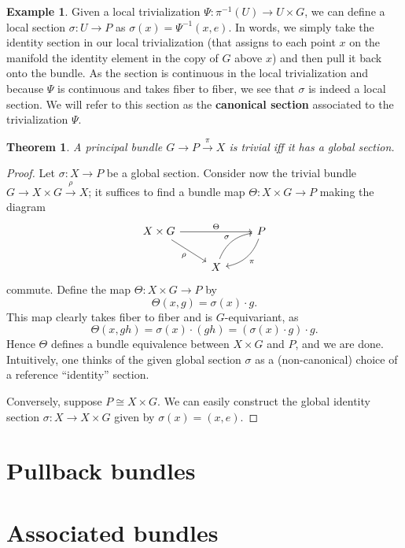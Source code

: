 \documentclass{book}
\theoremstyle{plain}
\newtheorem{thm}{Theorem}
\theoremstyle{definition}
\newtheorem{exmp}{Example}
\theoremstyle{remark}
\begin{document}
\begin{exmp}
    Given a local trivialization $\Psi:\pi^{-1}(U)\to U\times G$, we can define a local section $\sigma:U\to P$ as $\sigma(x)=\Psi^{-1}(x,e)$. In words, we simply take the identity section in our local trivialization (that assigns to each point $x$ on the manifold the identity element in the copy of $G$ above $x$) and then pull it back onto the bundle. As the section is continuous in the local trivialization and because $\Psi$ is continuous and takes fiber to fiber, we see that $\sigma$ is indeed a local section. We will refer to this section as the \textbf{canonical section} associated to the trivialization $\Psi$.
\end{exmp}

\begin{thm}
    A principal bundle $G\to P\overset{\pi}{\to} X$ is trivial iff it has a global section.
\end{thm}
\begin{proof}
    Let $\sigma:X\to P$ be a global section. Consider now the trivial bundle $G\to X\times G\overset{\rho}{\to}X$; it suffices to find a bundle map $\Theta: X\times G\to P$ making the diagram 
    \begin{equation*}
        \begin{tikzcd}
            X\times G\arrow{rr}{\Theta}\arrow[swap]{rd}{\rho}&&P\arrow[bend left]{ld}{\pi}\\
            &X\arrow[bend left]{ru}{\sigma}&
        \end{tikzcd}
    \end{equation*}
    commute. Define the map $\Theta:X\times G\to P$ by
    \[\Theta(x,g)=\sigma(x)\cdot g.\]
    This map clearly takes fiber to fiber and is $G$-equivariant, as
    \[\Theta(x,gh)=\sigma(x)\cdot (gh)=(\sigma(x)\cdot g)\cdot g.\]
    Hence $\Theta$ defines a bundle equivalence between $X\times G$ and $P$, and we are done. Intuitively, one thinks of the given global
    section $\sigma$ as a (non-canonical) choice of a reference ``identity'' section.

    Conversely, suppose $P\cong X\times G$. We can easily construct the global identity section $\sigma: X\to X\times G$ given by $\sigma(x)=(x,e)$.
\end{proof}

\section{Pullback bundles}

\section{Associated bundles}
\end{document}
